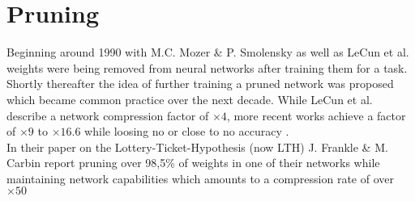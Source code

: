 \section{Pruning}
Beginning around 1990 with M.C. Mozer \& P. Smolensky \cite{Skeletonization} as well as LeCun et al. \cite{Optimal-Brain-Damage} weights were being removed from neural networks after training them for a task. Shortly thereafter the idea of further training a pruned network was proposed \cite{Optimal-Brain-Surgeon} which became common practice over the next decade. While LeCun et al. describe a network compression factor of $\times4$, more recent works achieve a factor of $\times9$ to $\times16.6$ while loosing no or close to no accuracy \cite{Learning_Weights_And_Connections} \cite{ThiNet}.\\
In their paper on the Lottery-Ticket-Hypothesis (now LTH) J. Frankle \& M. Carbin report pruning over 98,5\% of weights in one of their networks while maintaining network capabilities which amounts to a compression rate of over $\times50$



